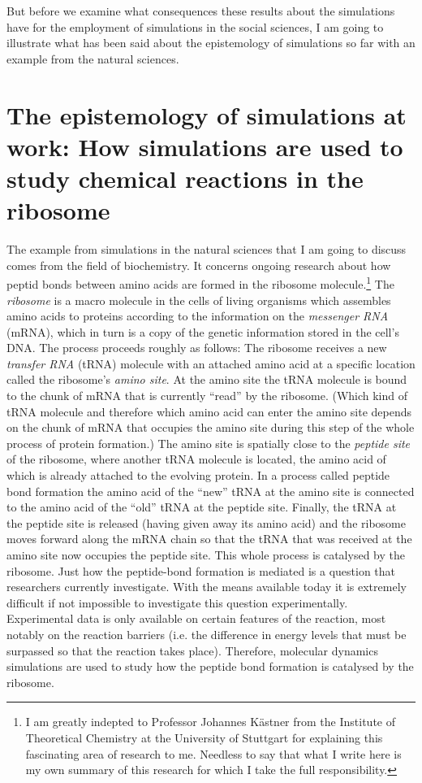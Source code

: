 \documentclass[onecollarge]{STJour}
\numberwithin{equation}{section}
\begin{document}
But before we examine what consequences these results about the
simulations have for the employment of simulations in the social
sciences, I am going to illustrate what has been said about the
epistemology of simulations so far with an example from the natural
sciences.

\section{The epistemology of simulations at work: How simulations are
used to study chemical reactions in the ribosome}

The example from simulations in the natural sciences that I am going to
discuss comes from the field of biochemistry. It concerns ongoing
research about how peptid bonds between amino acids are formed in the
ribosome molecule.\footnote{I am greatly indepted to Professor Johannes
Kästner from the Institute of Theoretical Chemistry at the University of
Stuttgart for explaining this fascinating area of research to me.
Needless to say that what I write here is my own summary of this research
for which I take the full responsibility.} The {\em ribosome} is a macro
molecule in the cells of living organisms which assembles amino acids to
proteins according to the information on the {\em messenger RNA} (mRNA),
which in turn is a copy of the genetic information stored in the cell's
DNA. The process proceeds roughly as follows: The ribosome receives a new
{\em transfer RNA} (tRNA) molecule with an attached amino acid at a
specific location called the ribosome's {\em amino site}. At the amino
site the tRNA molecule is bound to the chunk of mRNA that is currently
``read'' by the ribosome. (Which kind of tRNA molecule and therefore which
amino acid can enter the amino site depends on the chunk of mRNA that
occupies the amino site during this step of the whole process of protein
formation.) The amino site is spatially close to the {\em peptide site}
of the ribosome, where another tRNA molecule is located, the amino acid
of which is already attached to the evolving protein. In a process called
peptide bond formation the amino acid of the ``new'' tRNA at the amino
site is connected to the amino acid of the ``old'' tRNA at the peptide
site. Finally, the tRNA at the peptide site is released (having given
away its amino acid) and the ribosome moves forward along the mRNA chain
so that the tRNA that was received at the amino site now occupies the
peptide site. This whole process is catalysed by the
ribosome. Just how the peptide-bond
formation is mediated is a question
that researchers currently investigate. With the means available today it
is extremely difficult if not impossible to investigate this question
experimentally. Experimental data is only available on certain features
of the reaction, most notably on the reaction barriers (i.e. the
difference in energy levels that must be surpassed so that the reaction
takes place). Therefore, molecular dynamics simulations are used to study
how the peptide bond formation is catalysed by the ribosome.
\end{document}
